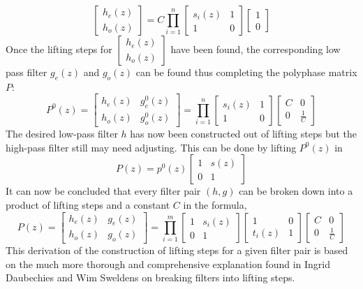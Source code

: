 \documentclass{article}
\begin{document}
\[\begin{bmatrix}
    h_e(z)\\
    h_o(z)
\end{bmatrix}=C\prod_{i=1}^{n}\begin{bmatrix}
    s_{i}(z) & 1\\
    1 & 0
\end{bmatrix}\begin{bmatrix}
    1\\0
\end{bmatrix}\]
Once the lifting steps for \(\begin{bmatrix}
    h_e(z) \\ h_o(z)
\end{bmatrix}\) have been found, the corresponding low pass filter \(g_e(z)\) and \(g_o(z)\) can be found thus completing the polyphase matrix \(P\):
\[P^{0}(z)=\begin{bmatrix}
    h_{e}(z) & g_{e}^{0}(z) \\
    h_{o}(z) & g_{o}^{0}(z)
\end{bmatrix}=\prod_{i=1}^{n}\begin{bmatrix}
    s_{i}(z) & 1 \\
    1 & 0
\end{bmatrix}\begin{bmatrix}
    C & 0 \\
    0 & \frac{1}{C}
\end{bmatrix}\]
The desired low-pass filter \(h\) has now been constructed out of lifting steps but the high-pass filter still may need adjusting. This can be done by lifting \(P^{0}(z)\) in
\[P(z)=p^{0}(z)\begin{bmatrix}
    1 & s(z) \\
    0 & 1
\end{bmatrix}\]
It can now be concluded that every filter pair \((h,g)\) can be broken down into a product of lifting steps and a constant \(C\) in the formula,
\[P(z)=\begin{bmatrix}
    h_{e}(z) & g_{e}(z) \\
    h_{o}(z) & g_{o}(z)
\end{bmatrix}=\prod_{i=1}^{m}\begin{bmatrix}
    1 & s_i(z) \\
    0 & 1
\end{bmatrix}\begin{bmatrix}
    1 & 0 \\
    t_{i}(z) & 1
\end{bmatrix}\begin{bmatrix}
    C & 0 \\
    0 & \frac{1}{C}
\end{bmatrix}\]
This derivation of the construction of lifting steps for a given filter pair is based on the much more thorough and comprehensive explanation found in Ingrid Daubechies and Wim Sweldens on breaking filters into lifting steps\cite{academicpaper2}.
\end{document}
